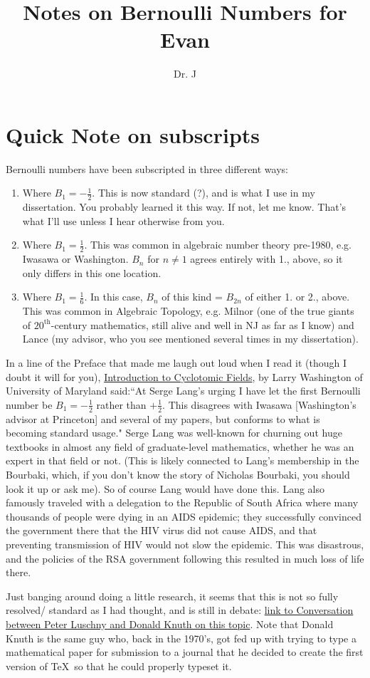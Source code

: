 \documentclass[12pt]{article}
\title{Notes on Bernoulli Numbers for Evan}
\author{Dr. J}
\begin{document}
\maketitle

\section{Quick Note on subscripts}

Bernoulli numbers have been subscripted in three different ways:
\begin{enumerate}
	\item
Where $B_1 = -\frac{1}{2}$.  This is now standard (?), and is what I use in my dissertation.  You probably learned it this way.  If not, let me know.  That's what I'll use unless I hear otherwise from you.
	\item
Where $B_1 = \frac{1}{2}$.  This was common in algebraic number theory pre-1980, e.g. Iwasawa or Washington.  $B_n$ for $n \neq 1$ agrees entirely with 1., above, so it only differs in this one location.
	\item
Where $B_1 = \frac{1}{6}$.  In this case, $B_n$ of this kind = $B_{2n}$ of either 1. or 2., above.  This was common in Algebraic Topology, e.g. Milnor (one of the true giants of $20^{\text{th}}$-century mathematics, still alive and well in NJ as far as I know) and Lance (my advisor, who you see mentioned several times in my dissertation).
\end{enumerate}

In a line of the Preface that made me laugh out loud when I read it (though I doubt it will for you), \underline{Introduction to Cyclotomic Fields}, by Larry Washington of University of Maryland said:``At Serge Lang's urging I have let the first Bernoulli number be $B_1 = -\frac{1}{2}$ rather than $+\frac{1}{2}$.  This disagrees with Iwasawa [Washington's advisor at Princeton] and several of my papers, but conforms to what is becoming standard usage."  Serge Lang was well-known for churning out huge textbooks in almost any field of graduate-level mathematics, whether he was an expert in that field or not.  (This is likely connected to Lang's membership in the Bourbaki, which, if you don't know the story of Nicholas Bourbaki, you should look it up or ask me).  So of course Lang would have done this.  Lang also famously traveled with a delegation to the Republic of South Africa where many thousands of people were dying in an AIDS epidemic; they successfully convinced the government there that the HIV virus did not cause AIDS, and that preventing transmission of HIV would not slow the epidemic.  This was disastrous, and the policies of the RSA government following this resulted in much loss of life there.

Just banging around doing a little research, it seems that this is not so fully resolved/ standard as I had thought, and is still in debate: \href{http://luschny.de/math/zeta/The-Bernoulli-Manifesto.html}{link to Conversation between Peter Luschny and Donald Knuth on this topic}.  Note that Donald Knuth is the same guy who, back in the 1970's, got fed up with trying to type a mathematical paper for submission to a journal that he decided to create the first version of \TeX\ so that he could properly typeset it.
\end{document}
